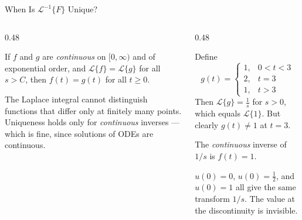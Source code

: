 \documentclass[aspectratio=169,11pt]{beamer}
\begin{document}
\begin{frame}{When Is $\mathcal{L}^{-1}\{F\}$ Unique?}
\footnotesize
\begin{columns}[T]
\begin{column}{0.48\textwidth}
\begin{formulabox}
If $f$ and $g$ are \emph{continuous} on $[0,\infty)$ and of exponential order, and $\mathcal{L}\{f\} = \mathcal{L}\{g\}$ for all $s > C$, then $f(t) = g(t)$ for all $t \ge 0$.
\end{formulabox}
\vspace{0.5mm}
\begin{conceptbox}
The Laplace integral cannot distinguish functions that differ only at finitely many points. Uniqueness holds only for \emph{continuous} inverses --- which is fine, since solutions of ODEs are continuous.
\end{conceptbox}
\end{column}
\begin{column}{0.48\textwidth}
\begin{examplebox}[Counterexample]
Define
\[g(t) = \begin{cases} 1, & 0 < t < 3 \\ 2, & t = 3 \\ 1, & t > 3 \end{cases}\]
Then $\mathcal{L}\{g\} = \frac{1}{s}$ for $s > 0$, which equals $\mathcal{L}\{1\}$. But clearly $g(t) \ne 1$ at $t=3$.

\medskip
The \emph{continuous} inverse of $1/s$ is $f(t) = 1$.
\end{examplebox}
\vspace{0.5mm}
\begin{warningbox}
$u(0) = 0$, $u(0) = \tfrac{1}{2}$, and $u(0) = 1$ all give the same transform $1/s$. The value at the discontinuity is invisible.
\end{warningbox}
\end{column}
\end{columns}
\end{frame}
\end{document}
